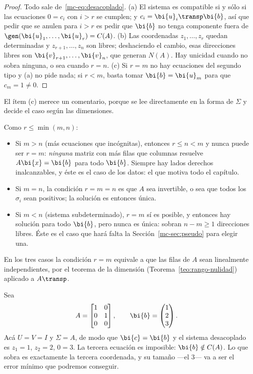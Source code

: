 \begin{proof}
Todo sale de~\eqref{mc-eq:desacoplado}. (a) El sistema es compatible si y
sólo si las ecuaciones $0=c_i$ con $i>r$ se cumplen; y $c_i=\bi{u}_i\transp\bi{b}$,
así que pedir que se anulen para $i>r$ es pedir que $\bi{b}$ no tenga
componente fuera de $\gen(\bi{u}_1,\dots,\bi{u}_r)=C(A)$.
(b) Las coordenadas $z_1,\dots,z_r$ quedan determinadas y
$z_{r+1},\dots,z_n$ son libres; deshaciendo el cambio, esas direcciones libres
son $\bi{v}_{r+1},\dots,\bi{v}_n$, que generan $N(A)$. Hay unicidad cuando no
sobra ninguna, o sea cuando $r=n$.
(c) Si $r=m$ no hay ecuaciones del segundo tipo y (a) no pide nada; si $r<m$,
basta tomar $\bi{b}=\bi{u}_m$ para que $c_m=1\ne0$.
\end{proof}

El ítem (c) merece un comentario, porque se lee directamente en la forma de
$\Sigma$ y decide el caso según las dimensiones.

\begin{remark}\label{mc-obs:tres-casos}
Como $r\le\min(m,n)$:
\begin{itemize}[leftmargin=*,itemsep=1pt]
\item Si $m>n$ (más ecuaciones que incógnitas), entonces $r\le n<m$ y nunca
puede ser $r=m$: \emph{ninguna} matriz con más filas que columnas resuelve
$A\bi{x}=\bi{b}$ para todo $\bi{b}$. Siempre hay lados derechos inalcanzables,
y éste es el caso de los datos: el que motiva todo el capítulo.
\item Si $m=n$, la condición $r=m=n$ es que $A$ sea invertible, o sea que
todos los $\sigma_i$ sean positivos; la solución es entonces única.
\item Si $m<n$ (sistema subdeterminado), $r=m$ sí es posible, y entonces hay
solución para todo $\bi{b}$, pero nunca es única: sobran $n-m\ge1$ direcciones
libres. Éste es el caso que hará falta la Sección~\ref{mc-sec:pseudo} para
elegir una.
\end{itemize}
En los tres casos la condición $r=m$ equivale a que las filas de $A$ sean
linealmente independientes, por el teorema de la dimensión
(Teorema~\ref{teo:rango-nulidad}) aplicado a $A\transp$.
\end{remark}

\begin{example}\label{mc-ej:incompatible}
Sea
\[
A=\begin{bmatrix}1&0\\ 0&1\\ 0&0\end{bmatrix},\qquad
\bi{b}=\begin{pmatrix}1\\ 2\\ 3\end{pmatrix}.
\]
Acá $U=V=I$ y $\Sigma=A$, de modo que $\bi{c}=\bi{b}$ y el sistema
desacoplado es $z_1=1$, $z_2=2$, $0=3$. La tercera ecuación es imposible:
$\bi{b}\notin C(A)$. Lo que sobra es exactamente la tercera coordenada, y su
tamaño ---el $3$--- va a ser el error mínimo que podremos conseguir.
\end{example}

